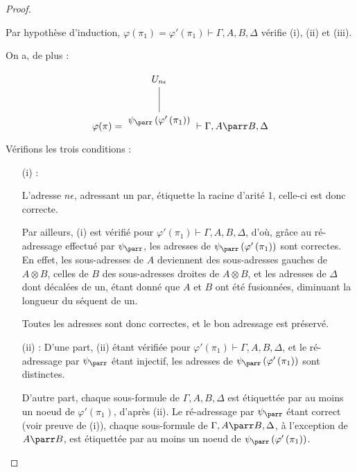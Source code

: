 \documentclass[11pt,a4paper]{article}
\theoremstyle{plain}
\theoremstyle{definition}
\theoremstyle{remark}
\newcommand*{\tensor}{\otimes}
\newcommand*{\someproof}{\pi}
\newcommand*{\encode}{\ensuremath{\varphi}}
\begin{document}
\begin{proof}
\begin{itemize}
    Par hypothèse d'induction, $\encode \left( \pi_1 \right) = \encode ' \left( \pi_1 \right) \vdash \Gamma, A, B, \Delta$ vérifie (i), (ii) et (iii).
    
    On a, de plus :

    \begin{equation*}
    \encode ( \someproof ) = \begin{tikzpicture}%
    [level distance=1.5cm,
    level 2/.style={sibling distance=3.5cm}]
    \node {$U_{n \epsilon}$}
        child {node {$\psi_\parr \left( \encode' \left( \pi_1 \right) \right)$}
    };
    \end{tikzpicture} \vdash \Gamma, A \parr B, \Delta
    \end{equation*}

    Vérifions les trois conditions :
    \begin{itemize}
        \item[(i) :]{L'adresse $n \epsilon$, adressant un par, étiquette la racine d'arité 1, celle-ci est donc correcte.
        
        Par ailleurs, (i) est vérifié pour $\encode ' \left( \pi_1 \right) \vdash \Gamma, A, B, \Delta$, d'où, grâce au ré-adressage effectué par $\psi_\parr$, les adresses de $\psi_\parr \left( \encode' \left( \pi_1 \right) \right)$ sont correctes. En effet, les sous-adresses de $A$ deviennent des sous-adresses gauches de $A \tensor B$, celles de $B$ des sous-adresses droites de $A \tensor B$, et les adresses de $\Delta$ dont décalées de un, étant donné que $A$ et $B$ ont été fusionnées, diminuant la longueur du séquent de un.
        
        Toutes les adresses sont donc correctes, et le bon adressage est préservé.
        }
        
        \item[(ii) :] D'une part, (ii) étant vérifiée pour $\encode ' \left( \pi_1 \right) \vdash \Gamma, A, B, \Delta$, et le ré-adressage par $\psi_\parr$ étant injectif, les adresses de $\psi_\parr \left( \encode' \left( \pi_1 \right) \right)$ sont distinctes.
        
        D'autre part, chaque sous-formule de $\Gamma, A, B, \Delta$ est étiquettée par au moins un noeud de $\encode ' \left( \pi_1 \right)$, d'après (ii). Le ré-adressage par $\psi_\parr$ étant correct (voir preuve de (i)), chaque sous-formule de $\Gamma, A \parr B, \Delta$, à l'exception de $A \parr B$, est étiquettée par au moins un noeud de $\psi_\parr \left( \encode' \left( \pi_1 \right) \right)$.
        

\end{itemize}
\end{itemize}
\end{proof}
\end{document}
